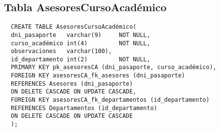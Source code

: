 \subsection{Tabla AsesoresCursoAcadémico}

\begin{verbatim}
  CREATE TABLE AsesoresCursoAcadémico(
  dni_pasaporte   varchar(9)     NOT NULL,
  curso_académico int(4)         NOT NULL,
  observaciones   varchar(100),
  id_departamento int(2)         NOT NULL,
  PRIMARY KEY pk_asesoresCA (dni_pasaporte, curso_académico),
  FOREIGN KEY asesoresCA_fk_asesores (dni_pasaporte)
  REFERENCES Asesores (dni_pasaporte)
  ON DELETE CASCADE ON UPDATE CASCADE,
  FOREIGN KEY asesoresCA_fk_departamentos (id_departamento)
  REFERENCES Departamentos (id_departamento)
  ON DELETE CASCADE ON UPDATE CASCADE
  );
\end{verbatim}